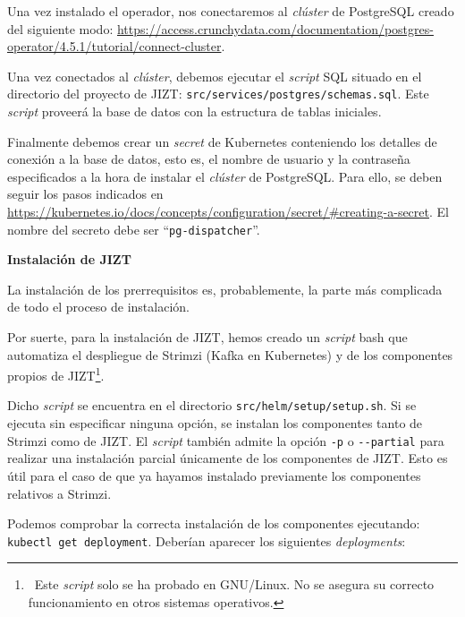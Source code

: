Una vez instalado el operador, nos conectaremos al \emph{clúster} de PostgreSQL creado del siguiente modo: \href{https://access.crunchydata.com/documentation/postgres-operator/4.5.1/tutorial/connect-cluster}{https://access.crunchydata.com/documentation/\newline postgres-operator/4.5.1/tutorial/connect-cluster}.

Una vez conectados al \emph{clúster}, debemos ejecutar el \emph{script} SQL situado en el directorio del proyecto de JIZT: \texttt{src/services/postgres/schemas.sql}. Este \emph{script} proveerá la base de datos con la estructura de tablas iniciales.

Finalmente debemos crear un \emph{secret} de Kubernetes conteniendo los detalles de conexión a la base de datos, esto es, el nombre de usuario y la contraseña especificados a la hora de instalar el \emph{clúster} de PostgreSQL. Para ello, se deben seguir los pasos indicados en \href{https://kubernetes.io/docs/concepts/configuration/secret/#creating-a-secret}{https://kubernetes.io/docs/\newline concepts/configuration/secret/\#creating-a-secret}.  El nombre del secreto debe ser ``\texttt{pg-dispatcher}''.

\vspace{0.5cm}
\noindent
\textbf{Instalación de JIZT}

La instalación de los prerrequisitos es, probablemente, la parte más complicada de todo el proceso de instalación.

Por suerte, para la instalación de JIZT, hemos creado un \emph{script} bash que automatiza el despliegue de Strimzi (Kafka en Kubernetes) y de los componentes propios de JIZT\footnote{\, Este \emph{script} solo se ha probado en GNU/Linux. No se asegura su correcto funcionamiento en otros sistemas operativos.}.

Dicho \emph{script} se encuentra en el directorio \texttt{src/helm/setup/setup.sh}. Si se ejecuta sin especificar ninguna opción, se instalan los componentes tanto de Strimzi como de JIZT. El \emph{script} también admite la opción \texttt{-p} o \texttt{-{}-partial} para realizar una instalación parcial únicamente de los componentes de JIZT. Esto es útil para el caso de que ya hayamos instalado previamente los componentes relativos a Strimzi.

Podemos comprobar la correcta instalación de los componentes ejecutando: \texttt{kubectl get deployment}. Deberían aparecer los siguientes \emph{deployments}:

